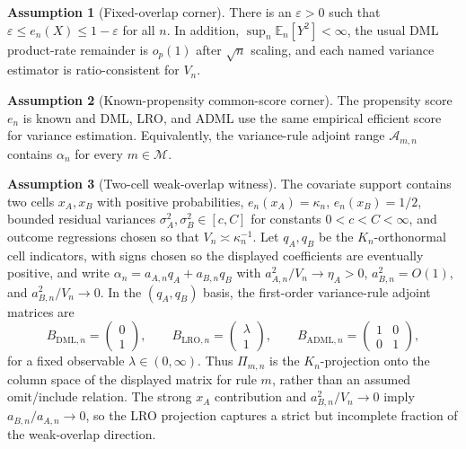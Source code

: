 \documentclass[11pt]{article}
\newcommand{\E}{\mathbb{E}}
\theoremstyle{definition}
\newtheorem{assumption}{Assumption}
\theoremstyle{plain}
\theoremstyle{remark}
\begin{document}
\begin{assumption}[Fixed-overlap corner]\label{ass:fixed-overlap}
There is an \(\varepsilon>0\) such that \(\varepsilon\le e_n(X)\le1-\varepsilon\) for all \(n\).  In addition, \(\sup_n\E_n[Y^2]<\infty\), the usual DML product-rate remainder is \(o_p(1)\) after \(\sqrt n\) scaling, and each named variance estimator is ratio-consistent for \(V_n\).
\end{assumption}

\begin{assumption}[Known-propensity common-score corner]\label{ass:known-propensity}
The propensity score \(e_n\) is known and DML, LRO, and ADML use the same empirical efficient score for variance estimation.  Equivalently, the variance-rule adjoint range \(\mathcal{A}_{m,n}\) contains \(\alpha_n\) for every \(m\in\mathcal M\).
\end{assumption}

\begin{assumption}[Two-cell weak-overlap witness]\label{ass:two-cell}
The covariate support contains two cells \(x_A,x_B\) with positive probabilities, \(e_n(x_A)=\kappa_n\), \(e_n(x_B)=1/2\), bounded residual variances \(\sigma_A^2,\sigma_B^2\in[c,C]\) for constants \(0<c<C<\infty\), and outcome regressions chosen so that \(V_n\asymp \kappa_n^{-1}\).  Let \(q_A,q_B\) be the \(K_n\)-orthonormal cell indicators, with signs chosen so the displayed coefficients are eventually positive, and write \(\alpha_n=a_{A,n}q_A+a_{B,n}q_B\) with \(a_{A,n}^2/V_n\to\eta_A>0\), \(a_{B,n}^2=O(1)\), and \(a_{B,n}^2/V_n\to0\).  In the \((q_A,q_B)\) basis, the first-order variance-rule adjoint matrices are
\[
  B_{\mathrm{DML},n}=\begin{pmatrix}0\\1\end{pmatrix},\qquad
  B_{\mathrm{LRO},n}=\begin{pmatrix}\lambda\\1\end{pmatrix},\qquad
  B_{\mathrm{ADML},n}=\begin{pmatrix}1&0\\0&1\end{pmatrix},
\]
for a fixed observable \(\lambda\in(0,\infty)\).  Thus \(\Pi_{m,n}\) is the \(K_n\)-projection onto the column space of the displayed matrix for rule \(m\), rather than an assumed omit/include relation.  The strong \(x_A\) contribution and \(a_{B,n}^2/V_n\to0\) imply \(a_{B,n}/a_{A,n}\to0\), so the LRO projection captures a strict but incomplete fraction of the weak-overlap direction.
\end{assumption}
\end{document}
